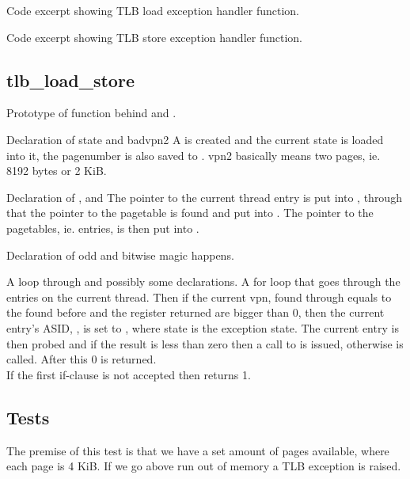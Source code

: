 {Code excerpt showing TLB load exception handler function.}

{Code excerpt showing TLB store exception handler function.}


\subsection{tlb\_load\_store}
    {Prototype of function behind  and
                          .}

    {Declaration of state and badvpn2}
A  is created and the current state is loaded
into it, the pagenumber is also saved to . vpn2
basically means two pages, ie. 8192 bytes or 2 KiB.


    {Declaration of ,  and }
The pointer to the current thread entry is put into , through
that the pointer to the pagetable is found and put into . The
pointer to the pagetables, ie. entries, is then put into .

    {Declaration of odd and bitwise magic happens.}

    {A loop through  and possibly some declarations.}
A for loop that goes through the entries on the current thread. Then if the
current vpn, found through  equals to the 
found before and the register returned are bigger than 0, then the current entry's ASID,
, is set to , where state is the
exception state. The current entry is then probed and if the result is less than
zero then a call to  is issued, otherwise
 is called. After this 0 is returned. \\
If the first if-clause is not accepted then 
returns 1.
\subsection{Tests}
The premise of this test is that we have a set amount of pages available, where
each page is 4 KiB. If we go above run out of memory a TLB exception is raised.
